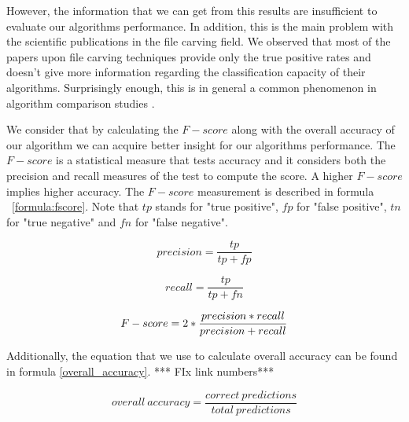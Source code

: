 However, the information that we can get from this results are insufficient to evaluate our algorithms performance. In addition, this is the main problem with the scientific publications in the file carving field. We observed that most of the papers upon file carving techniques provide only the true positive rates and doesn't give more information regarding the classification capacity of their algorithms. Surprisingly enough, this is in general a common phenomenon in algorithm comparison studies \cite{Demsar}\cite{Sokolova}.

We consider that by calculating the $F-score$ along with the overall accuracy of our algorithm we can acquire better insight for our algorithms performance. The $F-score$  is a statistical measure that tests accuracy and it considers both the precision and recall  measures of the test to compute the score. A higher $F-score$ implies higher accuracy. The $F-score$ measurement is described in formula ~\ref{formula:fscore}. Note that $tp$ stands for "true positive", $fp$ for "false positive", $tn$ for "true negative" and $fn$ for "false negative".




\noindent\begin{minipage}{.5\linewidth}
\small

\begin{equation}
precision = \frac{tp}{tp + fp}
\end{equation}
\end{minipage}%
\begin{minipage}{.5\linewidth}
\small
\begin{equation}
recall = \frac{tp}{tp + fn}
\end{equation}
\end{minipage}%

\begin{center}
\begin{minipage}{.5\linewidth}
\small
\begin{equation}
\newline
F-score = 2 * \frac{precision * recall}{precision + recall}
\end{equation}
\label{formula:fscore}
\end{minipage}
\end{center}

Additionally, the equation that we use to calculate overall accuracy can be found in formula \ref{overall_accuracy}. *** FIx link numbers***

\begin{center}
\noindent\begin{minipage}{.5\linewidth}
\small
\begin{equation}
overall \ accuracy = \frac{correct\ predictions}{total\ predictions}  
\end{equation}
\label{overall_accuracy}
\end{minipage}
\end{center}

